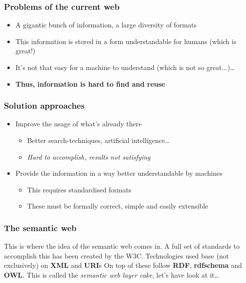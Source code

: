 \documentclass[handout]{beamer}
\begin{document}
        \begin{frame}
            \frametitle{Problems of the current web}

            \begin{itemize}
                \item A gigantic bunch of information, a large diversity of formats
                \pause
                \item This information is stored in a form understandable for humans (which is great!)
                \pause
                \item It's not that easy for a machine to understand (which is not so great...)\ldots 
                \pause
                \item \textbf{Thus, information is hard to find and reuse}
            \end{itemize}
        \end{frame}

        \begin{frame}
            \frametitle{Solution approaches}

            \begin{itemize}
                \item Improve the usage of what's already there
                \pause
                \begin{itemize}
                    \item Better search-techniques, artificial intelligence\ldots
                    \pause
                    \item \textit{Hard to accomplish, results not satisfying}
                    \pause
                \end{itemize}
                \item Provide the information in a way better understandable by machines
                \pause
                \begin{itemize}
                    \item This requires standardised formats
                    \pause
                    \item These must be formally correct, simple and easily extensible
                \end{itemize}
            \end{itemize}
        \end{frame}

        \begin{frame}
            \frametitle{The semantic web}

            This is where the idea of the semantic web comes in.
            \vskip 0.3cm
            A full set of standards to accomplish this has been created by the W3C.
            \vskip 0.3cm
            Technologies used base (not exclusively) on \textbf{XML} and \textbf{URI}s
            \vskip 0.3cm
            On top of these follow \textbf{RDF}, \textbf{rdfschema} and \textbf{OWL}.
            \vskip 0.3cm
            This is called the \textit{semantic web layer cake}, let's have look at it\ldots
        \end{frame}
\end{document}
